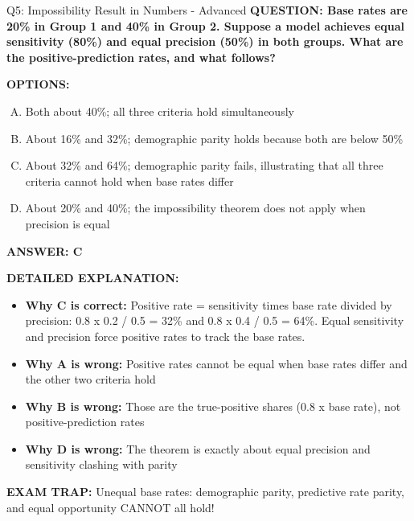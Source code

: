 \documentclass[8pt]{beamer}
\begin{document}
\begin{frame}[shrink=6]{Q5: Impossibility Result in Numbers - Advanced}
\fontsize{6.5}{7.5}\selectfont
\textbf{QUESTION: Base rates are 20\% in Group 1 and 40\% in Group 2. Suppose a model achieves equal sensitivity (80\%) and equal precision (50\%) in both groups. What are the positive-prediction rates, and what follows?}

\vspace{0.1cm}
\textbf{OPTIONS:}
\begin{enumerate}[A.]
\item Both about 40\%; all three criteria hold simultaneously
\item About 16\% and 32\%; demographic parity holds because both are below 50\%
\item About 32\% and 64\%; demographic parity fails, illustrating that all three criteria cannot hold when base rates differ
\item About 20\% and 40\%; the impossibility theorem does not apply when precision is equal
\end{enumerate}

\vspace{0.1cm}
\textcolor{myblue}{\textbf{ANSWER: C}}

\vspace{0.1cm}
\textbf{DETAILED EXPLANATION:}
\begin{itemize}
\item \textbf{Why C is correct:} Positive rate = sensitivity times base rate divided by precision: 0.8 x 0.2 / 0.5 = 32\% and 0.8 x 0.4 / 0.5 = 64\%. Equal sensitivity and precision force positive rates to track the base rates.
\item \textbf{Why A is wrong:} Positive rates cannot be equal when base rates differ and the other two criteria hold
\item \textbf{Why B is wrong:} Those are the true-positive shares (0.8 x base rate), not positive-prediction rates
\item \textbf{Why D is wrong:} The theorem is exactly about equal precision and sensitivity clashing with parity
\end{itemize}

\textcolor{myred}{\textbf{EXAM TRAP:}} Unequal base rates: demographic parity, predictive rate parity, and equal opportunity CANNOT all hold!
\end{frame}
\end{document}
